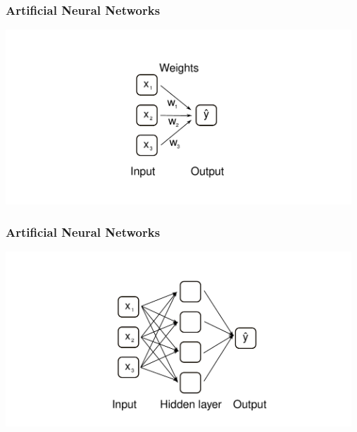 \documentclass[aspectratio=169]{beamer}
\begin{document}
\begin{frame}
  \frametitle{Artificial Neural Networks}
  \begin{center}    
    \includegraphics[width=13.0cm]{images/ANN_without_hidden_layer.pdf}
  \end{center}  
\end{frame}

\begin{frame}
  \frametitle{Artificial Neural Networks}
  \begin{center}
    \includegraphics[width=13.0cm]{images/ANN_with_hidden_layer.pdf}
  \end{center}  
\end{frame}


\end{document}
